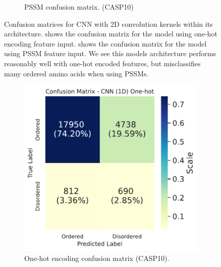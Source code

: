 \documentclass{l4proj}
\begin{document}
\begin{figure}[!htb]
\begin{subfigure}[b]{0.48\textwidth}
        \caption{PSSM confusion matrix. (CASP10)}
        \label{fig:caspcf2dpssm}
    \end{subfigure}
    \caption{Confusion matrices for CNN with 2D convolution kernels within its architecture.  shows the confusion matrix for the model using one-hot encoding feature input.  shows the confusion matrix for the model using PSSM feature input. We see this models architecture performs reasonably well with one-hot encoded features, but misclassifies many ordered amino acids when using PSSMs.}
    \label{fig:caspcf2d}
\end{figure}

\begin{figure}[!htb] 
    \centering
    \begin{subfigure}[b]{0.48\textwidth}
        \includegraphics[width=\textwidth]{images/confmats/CASP10CNN1D1hot-cf.pdf}
        \caption{One-hot encoding confusion matrix (CASP10).}
        \label{fig:caspcf1d1hot}
    \end{subfigure}
    ~
    \begin{subfigure}[b]{0.48\textwidth}

\end{subfigure}
\end{figure}
\end{document}
